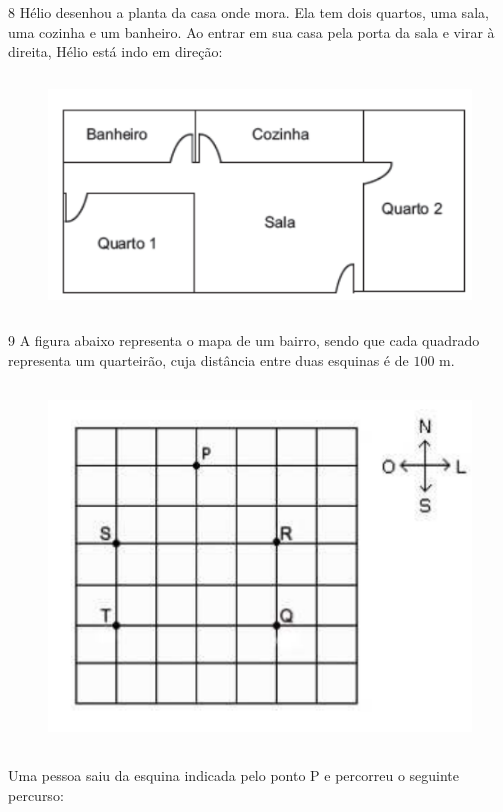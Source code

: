 {

\num{8}  Hélio desenhou a planta da casa onde mora. Ela tem dois quartos, uma
sala, uma cozinha e um banheiro. Ao entrar em sua casa pela porta da sala e virar à direita, Hélio está
indo em direção:

\begin{figure}
\includegraphics[width=4.94792in,height=2.46875in]{./imgSAEB_6_MAT/media/image71.png}
\end{figure}


\num{9}  A figura abaixo representa o mapa de um bairro, sendo que cada
quadrado representa um quarteirão, cuja distância entre duas esquinas é
de $100$ m.

\begin{figure}
\includegraphics[width=4.82569in,height=3.77917in]{./imgSAEB_6_MAT/media/image72.png}
\end{figure}

Uma pessoa saiu da esquina indicada pelo ponto P e percorreu o seguinte
percurso:

}
